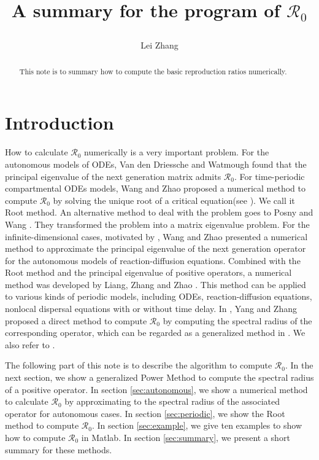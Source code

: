 \documentclass[12pt,reqno]{article}
\newcommand{\R}{\mathcal{R}_0}
\begin{document}
\title{A summary for the program of $\R$
\date{\empty}
\author{Lei Zhang}
}\maketitle
\begin{abstract}
This note is to summary how to compute the basic reproduction ratios numerically.
\end{abstract}
\section{Introduction}
How to calculate $\R$ numerically is a very important problem.
For the autonomous models of ODEs, Van den Driessche and Watmough \cite{van2002reproduction} found that the principal eigenvalue of the next generation matrix admits $\R$. For time-periodic compartmental ODEs models, Wang and Zhao \cite{wang2008threshold} proposed a numerical method to compute $\R$ by solving the unique root of a critical equation(see \cite[Theorem 2.1]{wang2008threshold}). We call it Root method. An alternative method to deal with the problem goes to Posny and Wang \cite{posny2014computing}. They transformed the problem into a matrix eigenvalue problem. For the infinite-dimensional cases, motivated by \cite{van2002reproduction}, Wang and Zhao presented a numerical method to approximate the principal eigenvalue of the next generation operator for the autonomous models of reaction-diffusion equations. Combined with the Root method and the principal eigenvalue of positive operators, a numerical method was developed by Liang, Zhang and Zhao \cite{liang2017lyme}. This method can be applied to various kinds of periodic models, including ODEs, reaction-diffusion equations, nonlocal dispersal equations with or without time delay.  In \cite{yang2018remarks}, Yang and Zhang proposed a direct method to compute $\R$ by computing the spectral radius of the corresponding operator, which can be regarded as a generalized method in \cite{posny2014computing}. We also refer to \cite{diekmann1990definition,bacaer2006epidemic}.

The following part of this note is to describe the algorithm to compute $\R$. In the next section, we show a generalized Power Method to compute the spectral radius of a positive operator. In section \ref{sec:autonomous}, we show a numerical method to calculate $\R$ by approximating to the spectral radius of the associated operator for autonomous cases. In section \ref{sec:periodic}, we show the Root method to compute $\R$. In section \ref{sec:example}, we give ten examples to show how to compute $\R$ in Matlab. In section \ref{sec:summary}, we present a short summary for these methods.
\end{document}
